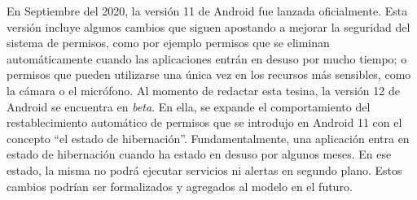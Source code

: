 En Septiembre del 2020, la versión 11 de Android fue lanzada oficialmente. Esta versión incluye
algunos cambios que siguen apostando a mejorar la seguridad del sistema de permisos, como por
ejemplo permisos que se eliminan automáticamente cuando las aplicaciones entrán en desuso por mucho
tiempo; o permisos que pueden utilizarse una única vez en los recursos más sensibles, como la cámara
o el micrófono.  Al momento de redactar esta tesina, la versión 12 de Android se encuentra en
\textit{beta}. En ella, se expande el comportamiento del restablecimiento automático de permisos que
se introdujo en Android 11 con el concepto ``el estado de hibernación''. Fundamentalmente, una
aplicación entra en estado de hibernación cuando ha estado en desuso por algunos meses. En ese
estado, la misma no podrá ejecutar servicios ni alertas en segundo plano. Estos cambios podrían ser
formalizados y agregados al modelo en el futuro.